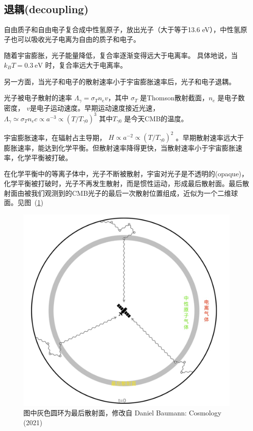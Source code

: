 \documentclass[12pt]{ctexart}
\newcommand{\reffig}[1]{图~(\ref{#1})}
\begin{document}
\subsection{退耦(decoupling)}

自由质子和自由电子复合成中性氢原子，放出光子（大于等于13.6 eV），中性氢原子也可以吸收光子电离为自由的质子和电子。

随着宇宙膨胀，光子能量降低，复合率逐渐变得远大于电离率。
具体地说，当 $k_B T =0.3 \mathrm{~eV}$ 时，复合率远大于电离率。

另一方面，当光子和电子的散射速率小于宇宙膨胀速率后，光子和电子退耦。

光子被电子散射的速率 $\Lambda_\gamma = \sigma_T n_e v$，其中 $\sigma_T$ 是Thomson散射截面，$n_e$ 是电子数密度， $v$是电子运动速度。早期运动速度接近光速，$\Lambda_\gamma \simeq \sigma_T n_e c \propto a^{-3} \propto \left(T/T_{\gamma 0}\right)^3 $ 其中$T_{\gamma 0}$ 是今天CMB的温度。

宇宙膨胀速率，在辐射占主导期， $H\propto a^{-2} \propto \left(T/T_{\gamma 0}\right)^2$ 。早期散射速率远大于膨胀速率，能达到化学平衡。但散射速率降得更快，当散射速率小于宇宙膨胀速率，化学平衡被打破。

在化学平衡中的等离子体中，光子不断被散射，宇宙对光子是不透明的(opaque)，化学平衡被打破时，光子不再发生散射，而是惯性运动，形成最后散射面。最后散射面由被我们观测到的CMB光子的最后一次散射位置组成，近似为一个二维球面。见\reffig{fig.LastScat}

\begin{figure}[!hbtp]
	\centering
	\includegraphics[width=1.0\linewidth]{lastScatter2022.jpg}
	\caption{图中灰色圆环为最后散射面，修改自 Daniel Baumann: Cosmology (2021)} \label{fig.LastScat}
\end{figure}
\end{document}
